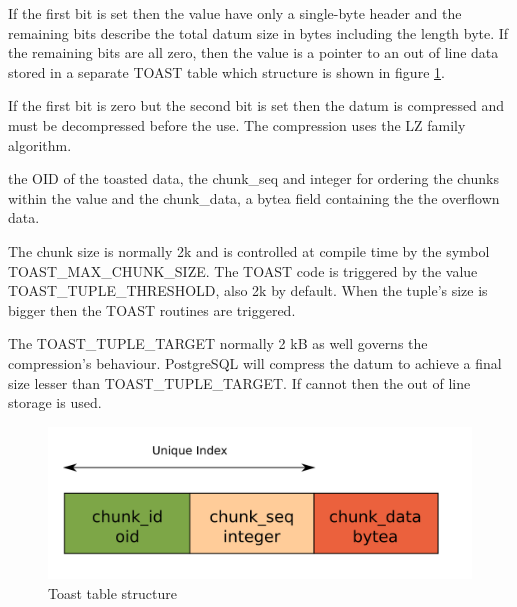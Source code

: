 If the first bit is set then the value have only a single-byte header and the remaining bits 
describe the total datum size in bytes including the length byte. If the remaining bits are all 
zero, then the value is a pointer to an out of line data stored in a separate TOAST table which 
structure is shown in figure \ref{fig:TOAST01}.\newline

If the first bit is zero but the second bit is set then the datum is compressed and must be 
decompressed before the use. The compression uses the LZ family algorithm.\newline

the OID of the toasted data, the chunk\_seq and integer for ordering the chunks 
within the value and the chunk\_data, a bytea field containing the the 
overflown data.\newline 

The chunk size is normally 2k and is controlled at compile time by the symbol 
TOAST\_MAX\_CHUNK\_SIZE. The TOAST code is triggered by the value TOAST\_TUPLE\_THRESHOLD, also 2k 
by default. When the tuple's size is bigger then the TOAST routines are triggered.\newline

The TOAST\_TUPLE\_TARGET normally 2 kB as well governs the compression's behaviour. PostgreSQL will 
compress the datum to achieve a final size lesser than TOAST\_TUPLE\_TARGET. If cannot then the out 
of line storage is used.

\begin{figure}[H]
\begin{center}

\includegraphics[scale=0.55]{images/toast_01}

\caption{Toast table structure}
\label{fig:TOAST01} 
\end{center}

\end{figure}

